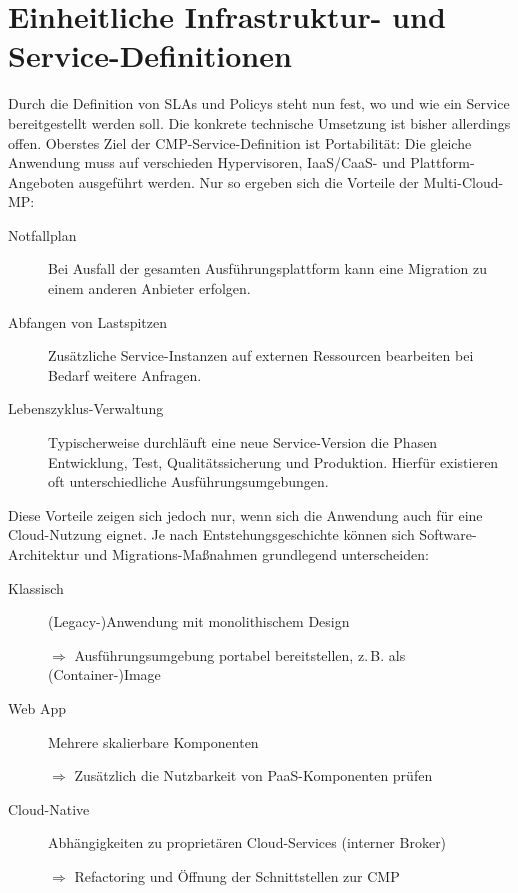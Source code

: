 
\section{Einheitliche Infrastruktur- und Service-Definitionen}

Durch die Definition von SLAs und Policys steht nun fest, wo und wie ein Service bereitgestellt werden soll. Die konkrete technische Umsetzung ist bisher allerdings offen. Oberstes Ziel der CMP-Service-Definition ist Portabilität: Die gleiche Anwendung muss auf verschieden Hypervisoren, IaaS/CaaS- und Plattform-Angeboten ausgeführt werden. Nur so ergeben sich die Vorteile der Multi-Cloud-MP:

\begin{description}
	
	\item[Notfallplan] Bei Ausfall der gesamten Ausführungsplattform kann eine Migration zu einem anderen Anbieter erfolgen.
	
	\item[Abfangen von Lastspitzen] Zusätzliche Service-Instanzen auf externen Ressourcen bearbeiten bei Bedarf weitere Anfragen.
	
	\item[Lebenszyklus-Verwaltung] Typischerweise durchläuft eine neue Service-Version die Phasen Entwicklung, Test, Qualitätssicherung und Produktion. Hierfür existieren oft unterschiedliche Ausführungsumgebungen.
	
\end{description}


\noindent
Diese Vorteile zeigen sich jedoch nur, wenn sich die Anwendung auch für eine Cloud-Nutzung eignet. Je nach Entstehungsgeschichte können sich Software-Architektur und Migrations-Maßnahmen grundlegend unterscheiden:

\begin{description}
	
	\item[Klassisch] (Legacy-)Anwendung mit monolithischem Design
	
	$\Rightarrow$ Ausführungsumgebung portabel bereitstellen, z.\,B. als (Container-)Image
	
	\item[Web App] Mehrere skalierbare Komponenten
	
	$\Rightarrow$ Zusätzlich die Nutzbarkeit von PaaS-Komponenten prüfen
	
	\item[Cloud-Native] Abhängigkeiten zu proprietären Cloud-Services (interner Broker)
	
	$\Rightarrow$ Refactoring und Öffnung der Schnittstellen zur CMP
	
\end{description}

